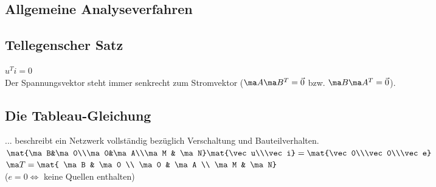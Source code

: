 \documentclass[fs, footer]{latex4ei}
\begin{document}
\begin{multicols*}{4}
\section{Allgemeine Analyseverfahren}

	\subsection{Tellegenscher Satz}
	$u^Ti = 0$\\
	Der Spannungsvektor steht immer senkrecht zum Stromvektor ($\ma A\ma B^T = \vec 0$ bzw. $\ma B\ma A^T = \vec 0$).

	\subsection{Die Tableau-Gleichung}
	... beschreibt ein Netzwerk vollständig bezüglich Verschaltung und Bauteilverhalten.\\
	$\mat{\ma B&\ma 0\\\ma 0&\ma A\\\ma M & \ma N}\mat{\vec u\\\vec i} = \mat{\vec 0\\\vec 0\\\vec e}$\qquad
	$\ma T = \mat{ \ma B & \ma 0 \\ \ma 0 & \ma A \\ \ma M & \ma N}$\\
	($e = 0 \Leftrightarrow$ keine Quellen enthalten)


\end{multicols*}
\end{document}
